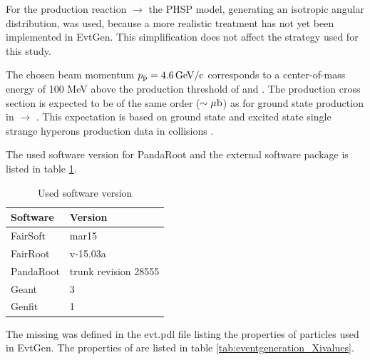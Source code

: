 For the production reaction \pbarpSystem $\rightarrow$ \excitedcascade\anticascade the PHSP model, 
generating an isotropic angular distribution, was used,
because a more realistic treatment has not yet been implemented in EvtGen. 
This simplification does not affect the strategy used for this study.

The chosen beam momentum $p_{\bar{\textnormal{p}}} = 4.6\, \textnormal{GeV/c}$ corresponds to a center-of-mass energy 
of 100 MeV above the production threshold of \excitedcascade and \anticascade.
The production cross section is expected to be of the same order ($\sim \mu\textnormal{b}$) as for ground 
state \cascade production in \pbarpSystem $\rightarrow$ \cascade\anticascade \cite{PANDAphysics2009}.
This expectation is based on ground state and excited state single strange hyperons production data in \pbarpSystem collisions \cite{CERN}.
\\
\vspace{11pt} 

The used software version for PandaRoot and the external software package is listed in table \ref{tab:eventgeneration_software}.

\begin{table}[tb]
	\centering
	\caption{Used software version}
	\label{tab:eventgeneration_software}
	\begin{tabular}{ll}
		\hline
		Software & Version \\
		\hline
		\hline
		FairSoft & mar15\\
		FairRoot & v-15.03a \\
		PandaRoot & trunk revision 28555 \\
		Geant & 3\\
		Genfit & 1\\\hline
			 
	\end{tabular}
\end{table}


The missing \excitedcascade was defined in the evt.pdl file listing the properties of particles used in EvtGen. 
The properties of \excitedcascade are listed in table \ref{tab:eventgeneration_Xivalues}.


